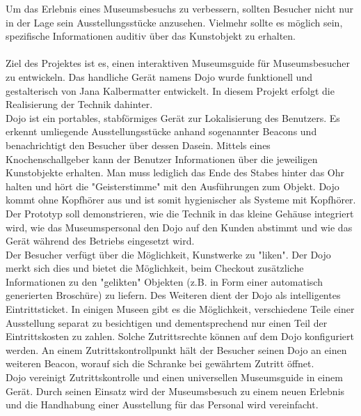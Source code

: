 Um das Erlebnis eines Museumsbesuchs zu verbessern, sollten Besucher nicht nur in der Lage sein Ausstellungsstücke anzusehen. Vielmehr sollte es möglich sein, spezifische Informationen auditiv über das Kunstobjekt zu erhalten.\\\\
Ziel des Projektes ist es, einen interaktiven Museumsguide für Museumsbesucher zu entwickeln. Das handliche Gerät namens Dojo wurde funktionell und gestalterisch von Jana Kalbermatter entwickelt. In diesem Projekt erfolgt die Realisierung der Technik dahinter. \\
Dojo ist ein portables, stabförmiges Gerät zur Lokalisierung des Benutzers. Es erkennt umliegende Ausstellungsstücke anhand sogenannter Beacons und benachrichtigt den Besucher über dessen Dasein. Mittels eines Knochenschallgeber kann der Benutzer Informationen über die jeweiligen Kunstobjekte erhalten. Man muss lediglich das Ende des Stabes hinter das Ohr halten und hört die "Geisterstimme" mit den Ausführungen zum Objekt. Dojo kommt ohne Kopfhörer aus und ist somit hygienischer als Systeme mit Kopfhörer.
Der Prototyp soll demonstrieren, wie die Technik in das kleine Gehäuse integriert wird, wie das Museumspersonal den Dojo auf den Kunden abstimmt und wie das Gerät während des Betriebs eingesetzt wird.\\
Der Besucher verfügt über die Möglichkeit, Kunstwerke zu "liken". Der Dojo merkt sich dies und bietet die Möglichkeit, beim Checkout zusätzliche Informationen zu den "gelikten" Objekten (z.B. in Form einer automatisch generierten Broschüre) zu liefern.
Des Weiteren dient der Dojo als intelligentes Eintrittsticket. In einigen Museen gibt es die Möglichkeit, verschiedene Teile einer Ausstellung separat zu besichtigen und dementsprechend nur einen Teil der Eintrittskosten zu zahlen. Solche Zutrittsrechte können auf dem Dojo konfiguriert werden. An einem Zutrittskontrollpunkt hält der Besucher seinen Dojo an einen weiteren Beacon, worauf sich die Schranke bei gewährtem Zutritt öffnet.\\

Dojo vereinigt Zutrittskontrolle und einen universellen Museumsguide in einem Gerät. Durch seinen Einsatz wird der Museumsbesuch zu einem neuen Erlebnis und die Handhabung einer Ausstellung für das Personal wird vereinfacht.

